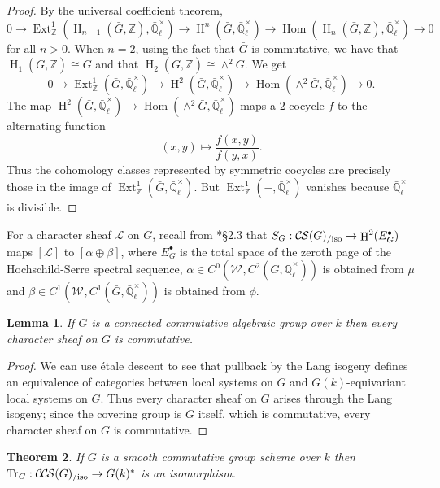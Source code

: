 \documentclass[10pt]{amsart}
\theoremstyle{plain}
\newtheorem{theorem}{Theorem}[section]
\newtheorem{lemma}[theorem]{Lemma}
\theoremstyle{definition}
\newcommand{\ZZ}{{\mathbb{Z}}}
\newcommand{\EE}{\mathbb{\bar Q}_\ell}
\newcommand{\Fq}{k}
\newcommand{\EEx}{\EE^\times}
\newcommand{\Weil}[1]{\mathcal{W}_{#1}}
\DeclareMathOperator{\Hom}{Hom}
\DeclareMathOperator{\Ext}{Ext}
\DeclareMathOperator{\Hh}{H}
\newcommand{\TrFrob}[1]{\operatorname{Tr}_{#1}}
\newcommand{\cs}[1]{{\mathcal{#1}}}
\newcommand{\CS}{{\mathcal{C\hskip-0.8pt S}}}
\newcommand{\CCS}{{\mathcal{C\hskip-.8pt C\hskip-0.8pt S}}}
\newcommand{\CSiso}[1]{\CS(#1)_{/\text{iso}}}
\newcommand{\CCSiso}[1]{\CCS(#1)_{/\text{iso}}}
\newcommand{\bG}{\bar{G}}
\begin{document}
\begin{proof}
By the universal coefficient theorem,
\[
0 \to \Ext^1_\ZZ(\Hh_{n-1}(\bG, \ZZ), \EEx) \to \Hh^n(\bG, \EEx) \to \Hom(\Hh_n(\bG, \ZZ), \EEx) \to 0
\]
for all $n > 0$.  When $n = 2$, using the fact that $\bG$ is commutative, we have that $\Hh_1(\bG, \ZZ) \cong \bG$
and that $\Hh_2(\bG, \ZZ) \cong \wedge^2 \bG$. We get
\[
0 \to \Ext^1_\ZZ(\bG, \EEx) \to \Hh^2(\bG, \EEx) \to \Hom(\wedge^2 \bG, \EEx) \to 0.
\]
The map $\Hh^2(\bG, \EEx) \to \Hom(\wedge^2 \bG, \EEx)$ maps a $2$-cocycle $f$ to the alternating function
\[
(x,y) \mapsto \frac{f(x,y)}{f(y,x)}.
\]
Thus the cohomology classes represented by symmetric cocycles are precisely those in the image of $\Ext^1_\ZZ(\bG, \EEx)$.
But $\Ext^1_\ZZ(-, \EEx)$ vanishes because $\EEx$ is divisible.
\end{proof}

For a character sheaf $\cs{L}$ on $G$, recall from \cite{cunningham-roe:13a}*{\S 2.3} that $S_G : \CSiso{G} \to \Hh^2(E_G^\bullet)$ maps
$[\cs{L}]$ to $[\alpha \oplus \beta]$, where $E_G^\bullet$ is the total space of the zeroth page
of the Hochschild-Serre spectral sequence, $\alpha \in C^0(\Weil{}, C^2(\bG, \EEx))$ is obtained from $\mu$ and
$\beta \in C^1(\Weil{}, C^1(\bG, \EEx))$ is obtained from $\phi$.

\begin{lemma} \label{lem:conncomm}
If $G$ is a connected commutative algebraic group over $\Fq$ then every character sheaf on $G$ is commutative.
\end{lemma}

\begin{proof}
We can use \'etale descent to see that pullback by the Lang isogeny defines an equivalence
of categories between local systems on $G$ and $G(\Fq)$-equivariant local systems on $G$.  Thus every character
sheaf on $G$ arises through the Lang isogeny; since the covering group is $G$ itself, which is commutative,
every character sheaf on $G$ is commutative.
\end{proof}

\begin{theorem} \label{thm:trfrobiso}
If $G$ is a smooth commutative group scheme over $\Fq$ then $\TrFrob{G} : \CCSiso{G} \to G(\Fq)^*$ is an isomorphism.
\end{theorem}
\end{document}
